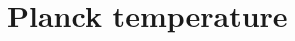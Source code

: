 \hypertarget{group___planck_temperature}{}\section{Planck temperature}
\label{group___planck_temperature}
